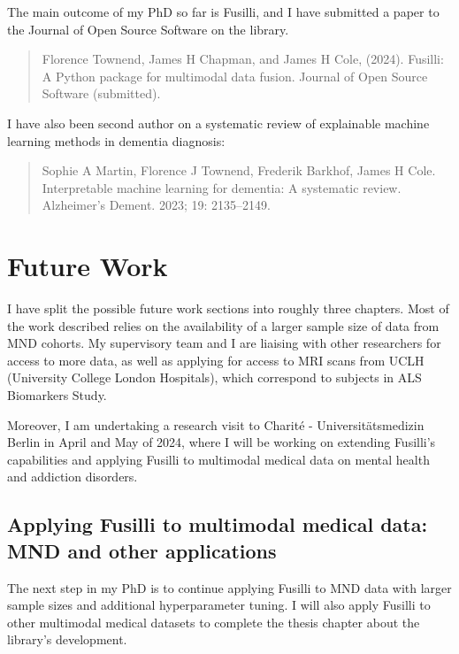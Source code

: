 The main outcome of my PhD so far is Fusilli, and I have submitted a paper to the Journal of Open Source Software on the library.

\begin{quote}
Florence Townend, James H Chapman, and James H Cole, (2024). Fusilli: A Python package for multimodal data fusion. Journal of Open Source Software (submitted).
\end{quote}

I have also been second author on a systematic review of explainable machine learning methods in dementia diagnosis:

\begin{quote}
    Sophie A Martin, Florence J Townend, Frederik Barkhof, James H Cole. Interpretable machine learning for dementia: A systematic review. Alzheimer's Dement. 2023; 19: 2135–2149.~\cite{martinInterpretableMachineLearning2023}
\end{quote}

\section{Future Work}

I have split the possible future work sections into roughly three chapters.
Most of the work described relies on the availability of a larger sample size of data from MND cohorts.
My supervisory team and I are liaising with other researchers for access to more data, as well as applying for access to MRI scans from UCLH (University College London Hospitals), which correspond to subjects in ALS Biomarkers Study.

Moreover, I am undertaking a research visit to Charité - Universitätsmedizin Berlin in April and May of 2024, where I will be working on extending Fusilli's capabilities and applying Fusilli to multimodal medical data on mental health and addiction disorders.

\subsection{Applying Fusilli to multimodal medical data: MND and other applications}

The next step in my PhD is to continue applying Fusilli to MND data with larger sample sizes and additional hyperparameter tuning.
I will also apply Fusilli to other multimodal medical datasets to complete the thesis chapter about the library's development.

